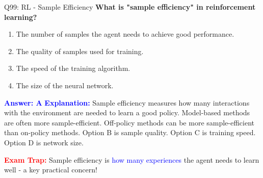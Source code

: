 \documentclass[8pt]{beamer}
\begin{document}
	\begin{frame}{Q99: RL - Sample Efficiency}
		\fontsize{6.5}{7.5}\selectfont
		\textbf{What is "sample efficiency" in reinforcement learning?}
		
		\begin{enumerate}
			\item The number of samples the agent needs to achieve good performance.
			\item The quality of samples used for training.
			\item The speed of the training algorithm.
			\item The size of the neural network.
		\end{enumerate}
		
		\vspace{0.1cm}
		\textcolor{blue}{\textbf{Answer: A}}
		\vspace{0.1cm}
		\textcolor{blue}{\textbf{Explanation:}} Sample efficiency measures how many interactions with the environment are needed to learn a good policy. Model-based methods are often more sample-efficient. Off-policy methods can be more sample-efficient than on-policy methods. Option B is sample quality. Option C is training speed. Option D is network size.
		
		\textcolor{red}{\textbf{Exam Trap:}} Sample efficiency is \textcolor{blue}{how many experiences} the agent needs to learn well - a key practical concern!
	\end{frame}
	
\end{document}
